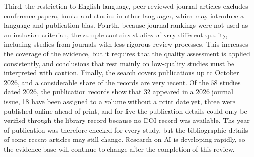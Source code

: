 Third, the restriction to English-language, peer-reviewed journal articles excludes conference papers, books and studies in other languages, which may introduce a language and publication bias. Fourth, because journal rankings were not used as an inclusion criterion, the sample contains studies of very different quality, including studies from journals with less rigorous review processes. This increases the coverage of the evidence, but it requires that the quality assessment is applied consistently, and conclusions that rest mainly on low-quality studies must be interpreted with caution. Finally, the search covers publications up to October 2026, and a considerable share of the records are very recent. Of the 58 studies dated 2026, the publication records show that 32 appeared in a 2026 journal issue, 18 have been assigned to a volume without a print date yet, three were published online ahead of print, and for five the publication details could only be verified through the library record because no DOI record was available. The year of publication was therefore checked for every study, but the bibliographic details of some recent articles may still change. Research on AI is developing rapidly, so the evidence base will continue to change after the completion of this review.
